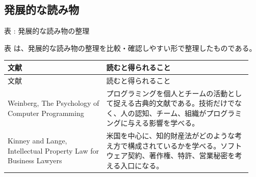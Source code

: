 \subsection*{発展的な読み物}


\begin{center}
\small
\par\smallskip\noindent{}\label{tab:ch14-06}表 \thetable: 発展的な読み物の整理\par\smallskip
表 \thetable は、発展的な読み物の整理を比較・確認しやすい形で整理したものである。\par\smallskip
\begin{longtable}{p{0.38\linewidth}p{0.57\linewidth}}
\toprule
文献 & 読むと得られること \\
\midrule
\endfirsthead
\toprule
文献 & 読むと得られること \\
\midrule
\endhead
Weinberg, The Psychology of Computer Programming & プログラミングを個人とチームの活動として捉える古典的文献である。技術だけでなく、人の認知、チーム、組織がプログラミングに与える影響を学べる。 \\
\midrule
Kinney and Lange, Intellectual Property Law for Business Lawyers & 米国を中心に、知的財産法がどのような考え方で構成されているかを学べる。ソフトウェア契約、著作権、特許、営業秘密を考える入口になる。 \\
\midrule
\bottomrule
\end{longtable}
\normalsize
\end{center}
